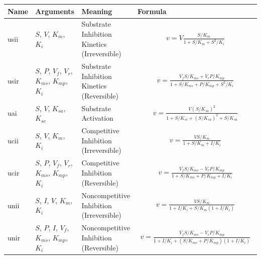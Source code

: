 \documentclass[10pt]{cekarticle}
\begin{document}
\addtocounter{table}{-1}
\begin{table}[ht]
\setlength{\abovedisplayskip}{-2pt}
\setlength{\belowdisplayskip}{1pt}
\begin{tabular}{|p{0.5in}|>{\raggedright}m{0.77in}|>{\raggedright}m{1.5in}|m{3.1in}|}
\hline
\textbf{Name} & \textbf{Arguments} & \textbf{Meaning} &
\textbf{Formula} \\
\hline

usii & $S$, $V$, $K_m$, $K_i$ & Substrate Inhibition Kinetics
(Irreversible) &
\begin{gather*}
v = V \frac{S/K_m}{1 + S/K_m + S^2/K_i}
\end{gather*}
\\ \hline

usir & $S$, $P$, $V_f$, $V_r$, $K_{ms}$, $K_{mp}$, $K_i$ & Substrate
Inhibition Kinetics (Reversible) &
\begin{gather*}
v = \frac{V_f S/K_{ms} + V_r
P/K_{mp}}{1 + S/K_{ms} + P/K_{mp} + S^2/K_i}
\end{gather*}
\\ \hline

uai & $S$, $V$, $K_{sa}$, $K_{sc}$ & Substrate Activation &
\begin{gather*}
v = \frac{V \left( S/K_{sa} \right)^2}{1 + S/K_{sc} + \left( S/K_{sa}\right)^2
  + S/K_{sa}}
\end{gather*}
\\ \hline

ucii & $S$, $V$, $K_m$, $K_i$ & Competitive Inhibition (Irreversible) &
\begin{gather*}
v = \frac{V S/K_m}{1 + S/K_m + I/K_i}
\end{gather*}
\\ \hline

ucir & $S$, $P$, $V_f$, $V_r$, $K_{ms}$, $K_{mp}$, $K_i$ & Competitive Inhibition
(Reversible) &
\begin{gather*}
v = \frac{V_f S/K_{ms} - V_r P/K_{mp}}{1 +
  S/K_{ms} + P/K_{mp} + I/K_i}
\end{gather*}
\\ \hline

unii & $S$, $I$, $V$, $K_m$, $K_i$ & Noncompetitive Inhibition
(Irreversible) &
\begin{gather*}
v = \frac{V S/K_m}{1 + I/K_i + S/K_m \left( 1 + I/K_i\right) }
\end{gather*}
\\ \hline

unir & $S$, $P$, $I$, $V_f$, $K_{ms}$, $K_{mp}$, $K_i$ & Noncompetitive
Inhibition (Reversible) &
\begin{gather*}
v = \frac{V_f S/K_{ms} - V_r P/K_{mp}}{1 +
  I/K_i + \left( S/K_{ms} + P/K_{mp} \right) \left( 1 + I/K_i\right) }
\end{gather*}
\\ \hline


\end{tabular}
\end{table}
\end{document}
